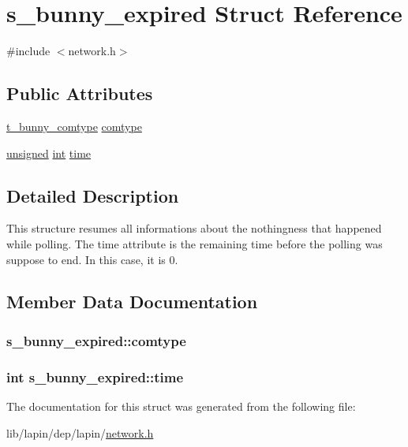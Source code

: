 \hypertarget{structs__bunny__expired}{\section{s\-\_\-bunny\-\_\-expired Struct Reference}
\label{structs__bunny__expired}
}


{\ttfamily \#include $<$network.\-h$>$}

\subsection*{Public Attributes}
\begin{DoxyCompactItemize}
\item 
\hyperlink{network_8h_ac01621d0080b82d3bebc95c8338b24ce}{t\-\_\-bunny\-\_\-comtype} \hyperlink{structs__bunny__expired_a94a9b6a1830db38cc1484472ec76c39e}{comtype}
\item 
\hyperlink{curses_8priv_8h_aca40206900cfc164654362fa8d4ad1e6}{unsigned} \hyperlink{term__entry_8h_ad65b480f8c8270356b45a9890f6499ae}{int} \hyperlink{structs__bunny__expired_a2c3d5c97551626338c5e75706975600a}{time}
\end{DoxyCompactItemize}


\subsection{Detailed Description}
This structure resumes all informations about the nothingness that happened while polling. The time attribute is the remaining time before the polling was suppose to end. In this case, it is 0. 

\subsection{Member Data Documentation}
\hypertarget{structs__bunny__expired_a94a9b6a1830db38cc1484472ec76c39e}{
\subsubsection[{comtype}]{ s\-\_\-bunny\-\_\-expired\-::comtype}}\label{structs__bunny__expired_a94a9b6a1830db38cc1484472ec76c39e}
\hypertarget{structs__bunny__expired_a2c3d5c97551626338c5e75706975600a}{
\subsubsection[{time}]{ {\bf int} s\-\_\-bunny\-\_\-expired\-::time}}\label{structs__bunny__expired_a2c3d5c97551626338c5e75706975600a}


The documentation for this struct was generated from the following file\-:\begin{DoxyCompactItemize}
\item 
lib/lapin/dep/lapin/\hyperlink{network_8h}{network.\-h}\end{DoxyCompactItemize}
